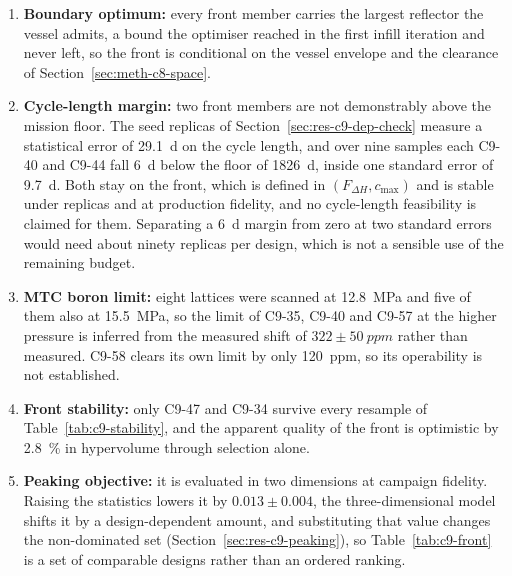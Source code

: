 \begin{enumerate}
  \item \textbf{Boundary optimum:} every front member carries the
        largest reflector the vessel admits, a bound the optimiser
        reached in the first infill iteration and never left, so the
        front is conditional on the vessel envelope and the clearance
        of Section~\ref{sec:meth-c8-space}.

  \item \textbf{Cycle-length margin:} two front members are not
        demonstrably above the mission floor. The seed replicas of
        Section~\ref{sec:res-c9-dep-check} measure a statistical error of
        \SI{29.1}{d} on the cycle length, and over nine samples each
        C9-40 and C9-44 fall \SI{6}{d} below the floor of \SI{1826}{d},
        inside one standard error of \SI{9.7}{d}. Both stay on the front,
        which is defined in $(F_{\Delta H}, c_\mathrm{max})$ and is
        stable under replicas and at production fidelity, and no
        cycle-length feasibility is claimed for them. Separating a
        \SI{6}{d} margin from zero at two standard errors would need
        about ninety replicas per design, which is not a sensible use
        of the remaining budget.

  \item \textbf{MTC boron limit:} eight lattices were scanned at
        \SI{12.8}{MPa} and five of them also at \SI{15.5}{MPa}, so the
        limit of C9-35, C9-40 and C9-57 at the higher pressure is
        inferred from the measured shift of $322 \pm \SI{50}{ppm}$
        rather than measured. C9-58 clears its own limit by only
        \SI{120}{ppm}, so its operability is not established.

  \item \textbf{Front stability:} only C9-47 and C9-34 survive every
        resample of Table~\ref{tab:c9-stability}, and the apparent
        quality of the front is optimistic by \SI{2.8}{\%} in
        hypervolume through selection alone.

  \item \textbf{Peaking objective:} it is evaluated in two dimensions
        at campaign fidelity. Raising the statistics lowers it by
        $0.013 \pm 0.004$, the three-dimensional model shifts it by a
        design-dependent amount, and substituting that value changes
        the non-dominated set (Section~\ref{sec:res-c9-peaking}), so
        Table~\ref{tab:c9-front} is a set of comparable designs rather
        than an ordered ranking.


\end{enumerate}
